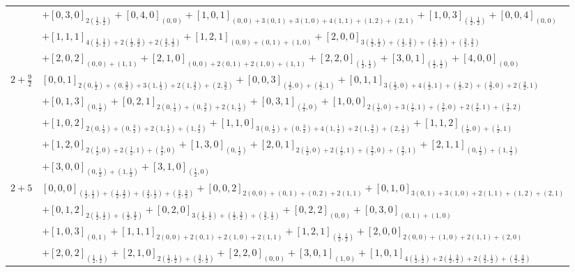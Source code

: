 \documentclass[12pt]{article}
\begin{document}
\begin{longtable}{|c|p{}|}
& $+[0,3,0]_{2(\frac{1}{2},\frac{1}{2})}+[0,4,0]_{(0,0)}+[1,0,1]_{(0,0)+3(0,1)+3(1,0)+4(1,1)+(1,2)+(2,1)}+[1,0,3]_{(\frac{1}{2},\frac{1}{2})}+[0,0,4]_{(0,0)}$ \\
& $+[1,1,1]_{4(\frac{1}{2},\frac{1}{2})+2(\frac{1}{2},\frac{3}{2})+2(\frac{3}{2},\frac{1}{2})}+[1,2,1]_{(0,0)+(0,1)+(1,0)}+[2,0,0]_{3(\frac{1}{2},\frac{1}{2})+(\frac{1}{2},\frac{3}{2})+(\frac{3}{2},\frac{1}{2})+(\frac{3}{2},\frac{3}{2})}$ \\
& $+[2,0,2]_{(0,0)+(1,1)}+[2,1,0]_{(0,0)+2(0,1)+2(1,0)+(1,1)}+[2,2,0]_{(\frac{1}{2},\frac{1}{2})}+[3,0,1]_{(\frac{1}{2},\frac{1}{2})}+[4,0,0]_{(0,0)}$ \\
\hline
$2+\frac{9}{2}$ & $[0,0,1]_{2(0,\frac{1}{2})+(0,\frac{3}{2})+3(1,\frac{1}{2})+2(1,\frac{3}{2})+(2,\frac{3}{2})}+[0,0,3]_{(\frac{1}{2},0)+(\frac{1}{2},1)}+[0,1,1]_{3(\frac{1}{2},0)+4(\frac{1}{2},1)+(\frac{1}{2},2)+(\frac{3}{2},0)+2(\frac{3}{2},1)}$ \\
& $+[0,1,3]_{(0,\frac{1}{2})}+[0,2,1]_{2(0,\frac{1}{2})+(0,\frac{3}{2})+2(1,\frac{1}{2})}+[0,3,1]_{(\frac{1}{2},0)}+[1,0,0]_{2(\frac{1}{2},0)+3(\frac{1}{2},1)+(\frac{3}{2},0)+2(\frac{3}{2},1)+(\frac{3}{2},2)}$ \\
& $+[1,0,2]_{2(0,\frac{1}{2})+(0,\frac{3}{2})+2(1,\frac{1}{2})+(1,\frac{3}{2})}+[1,1,0]_{3(0,\frac{1}{2})+(0,\frac{3}{2})+4(1,\frac{1}{2})+2(1,\frac{3}{2})+(2,\frac{1}{2})}+[1,1,2]_{(\frac{1}{2},0)+(\frac{1}{2},1)}$ \\
& $+[1,2,0]_{2(\frac{1}{2},0)+2(\frac{1}{2},1)+(\frac{3}{2},0)}+[1,3,0]_{(0,\frac{1}{2})}+[2,0,1]_{2(\frac{1}{2},0)+2(\frac{1}{2},1)+(\frac{3}{2},0)+(\frac{3}{2},1)}+[2,1,1]_{(0,\frac{1}{2})+(1,\frac{1}{2})}$ \\
& $+[3,0,0]_{(0,\frac{1}{2})+(1,\frac{1}{2})}+[3,1,0]_{(\frac{1}{2},0)}$ \\
\hline
$2+5$ & $[0,0,0]_{(\frac{1}{2},\frac{1}{2})+(\frac{1}{2},\frac{3}{2})+(\frac{3}{2},\frac{1}{2})+(\frac{3}{2},\frac{3}{2})}+[0,0,2]_{2(0,0)+(0,1)+(0,2)+2(1,1)}+[0,1,0]_{3(0,1)+3(1,0)+2(1,1)+(1,2)+(2,1)}$ \\
& $+[0,1,2]_{2(\frac{1}{2},\frac{1}{2})+(\frac{1}{2},\frac{3}{2})}+[0,2,0]_{3(\frac{1}{2},\frac{1}{2})+(\frac{1}{2},\frac{3}{2})+(\frac{3}{2},\frac{1}{2})}+[0,2,2]_{(0,0)}+[0,3,0]_{(0,1)+(1,0)}$ \\
& $+[1,0,3]_{(0,1)}+[1,1,1]_{2(0,0)+2(0,1)+2(1,0)+2(1,1)}+[1,2,1]_{(\frac{1}{2},\frac{1}{2})}+[2,0,0]_{2(0,0)+(1,0)+2(1,1)+(2,0)}$ \\
& $+[2,0,2]_{(\frac{1}{2},\frac{1}{2})}+[2,1,0]_{2(\frac{1}{2},\frac{1}{2})+(\frac{3}{2},\frac{1}{2})}+[2,2,0]_{(0,0)}+[3,0,1]_{(1,0)}+[1,0,1]_{4(\frac{1}{2},\frac{1}{2})+2(\frac{1}{2},\frac{3}{2})+2(\frac{3}{2},\frac{1}{2})+(\frac{3}{2},\frac{3}{2})}$ \\

\end{longtable}
\end{document}
